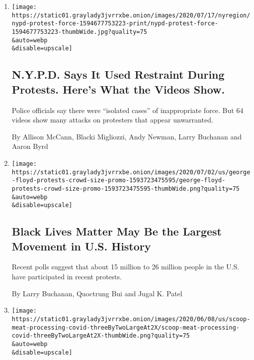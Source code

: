 \begin{enumerate}
\def\labelenumi{\arabic{enumi}.}
\item
  \href{/interactive/2020/07/14/nyregion/nypd-george-floyd-protests.html}{}

  \texttt{[image: https://static01.graylady3jvrrxbe.onion/images/2020/07/17/nyregion/nypd-protest-force-1594677753223-print/nypd-protest-force-1594677753223-thumbWide.jpg?quality=75\\\&auto=webp\\\&disable=upscale]}

  \hypertarget{nypd-says-it-used-restraint-during-protests-heres-what-the-videos-show}{%
  \subsection{N.Y.P.D. Says It Used Restraint During Protests. Here's
  What the Videos
  Show.}\label{nypd-says-it-used-restraint-during-protests-heres-what-the-videos-show}}

  Police officials say there were ``isolated cases'' of inappropriate
  force. But 64 videos show many attacks on protesters that appear
  unwarranted.

  By Allison McCann, Blacki Migliozzi, Andy Newman, Larry Buchanan and
  Aaron Byrd
\item
  \href{/interactive/2020/07/03/us/george-floyd-protests-crowd-size.html}{}

  \texttt{[image: https://static01.graylady3jvrrxbe.onion/images/2020/07/02/us/george-floyd-protests-crowd-size-promo-1593723475595/george-floyd-protests-crowd-size-promo-1593723475595-thumbWide.png?quality=75\\\&auto=webp\\\&disable=upscale]}

  \hypertarget{black-lives-matter-may-be-the-largest-movement-in-us-history}{%
  \subsection{Black Lives Matter May Be the Largest Movement in U.S.
  History}\label{black-lives-matter-may-be-the-largest-movement-in-us-history}}

  Recent polls suggest that about 15 million to 26 million people in the
  U.S. have participated in recent protests.

  By Larry Buchanan, Quoctrung Bui and Jugal K. Patel
\item
  \href{/interactive/2020/06/08/us/meat-processing-plants-coronavirus.html}{}

  \texttt{[image: https://static01.graylady3jvrrxbe.onion/images/2020/06/08/us/scoop-meat-processing-covid-threeByTwoLargeAt2X/scoop-meat-processing-covid-threeByTwoLargeAt2X-thumbWide.png?quality=75\\\&auto=webp\\\&disable=upscale]}


\end{enumerate}
